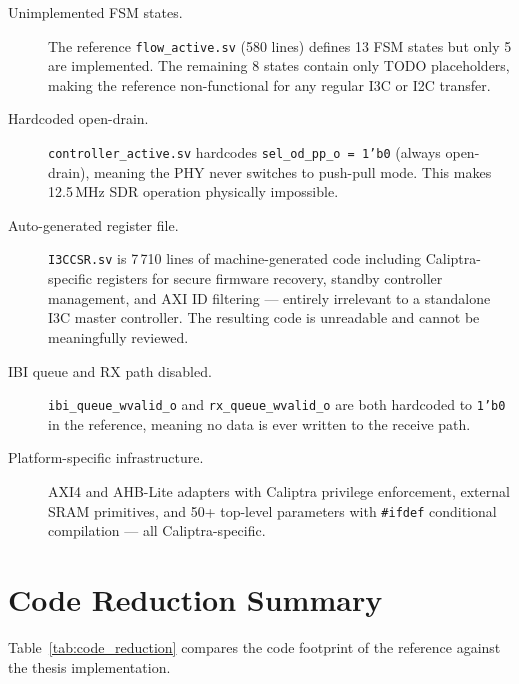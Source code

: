 \documentclass[12pt, a4paper, oneside]{report}
\newcommand{\signal}[1]{\texttt{#1}}
\newcommand{\file}[1]{\texttt{#1}}
\begin{document}
\begin{description}
  \item[Unimplemented FSM states.] The reference \file{flow\_active.sv} (580 lines)
    defines 13 FSM states but only 5 are implemented. The remaining 8 states contain
    only TODO placeholders, making the reference non-functional for any regular I3C or
    I2C transfer.

  \item[Hardcoded open-drain.] \file{controller\_active.sv} hardcodes
    \signal{sel\_od\_pp\_o\,=\,1'b0} (always open-drain), meaning the PHY never
    switches to push-pull mode. This makes 12.5\,MHz SDR operation physically
    impossible.

  \item[Auto-generated register file.] \file{I3CCSR.sv} is 7\,710 lines of
    machine-generated code including Caliptra-specific registers for secure firmware
    recovery, standby controller management, and AXI ID filtering --- entirely
    irrelevant to a standalone I3C master controller. The resulting code is
    unreadable and cannot be meaningfully reviewed.

  \item[IBI queue and RX path disabled.] \signal{ibi\_queue\_wvalid\_o} and
    \signal{rx\_queue\_wvalid\_o} are both hardcoded to \signal{1'b0} in the
    reference, meaning no data is ever written to the receive path.

  \item[Platform-specific infrastructure.] AXI4 and AHB-Lite adapters with Caliptra
    privilege enforcement, external SRAM primitives, and 50+ top-level parameters
    with \texttt{\#ifdef} conditional compilation --- all Caliptra-specific.
\end{description}

\section{Code Reduction Summary}

Table~\ref{tab:code_reduction} compares the code footprint of the reference against
the thesis implementation.
\end{document}
